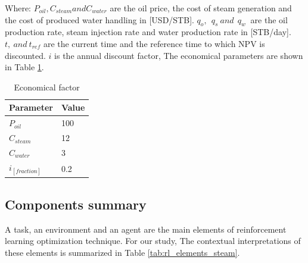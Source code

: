 Where:
$P_{oil}, C_{steam} and C_{water}$ are the oil price,  the cost of steam generation and the cost of produced water handling in [USD/STB].
$ q_o,\ \ q_s\ and\ \ q_w\ $ are the oil production rate, steam injection rate and water production rate in [STB/day].
$t,\ and\ t_{ref}$ are the current time and the reference time to which \ac{NPV} is discounted. $i$ is the annual discount factor, 
The economical parameters are shown in Table \ref{tab:steam_economical}. 

\begin{table}[]
\center
\begin{tabular}{|l|l|}
\hline
     Parameter & Value \\ \hline
    $P_{oil}$ & 100 \\ \hline
    $C_{steam}$  & 12 \\ \hline
    $C_{water}$ &  3 \\ \hline
    $i_[fraction]$ & 0.2  \\ \hline
\end{tabular}
\caption{Economical factor}
\label{tab:steam_economical}
\end{table}

\subsection{Components summary}
A task, an environment and an agent are the main elements of reinforcement learning optimization technique. For our study, The contextual interpretations of these elements is summarized in Table \ref{tab:rl_elements_steam}.

\begin{table}[]
\caption{Elements of the reinforcement learning in the context of steam injection }
\label{tab:rl_elements_steam}
\end{table}

